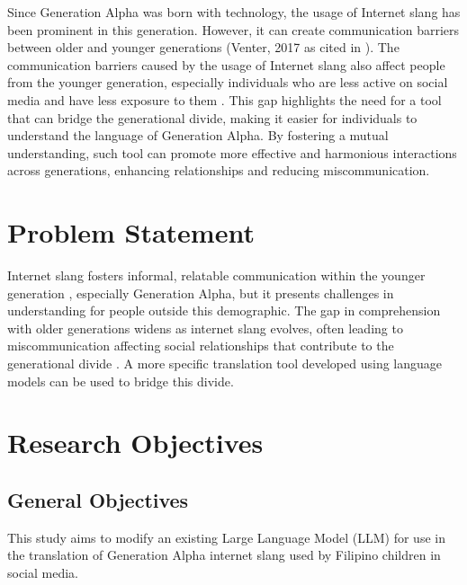 Since Generation Alpha was born with technology, the usage of Internet slang has been prominent in this generation.
However, it can create communication barriers between older and younger generations (Venter, 2017 as cited in \cite{Ghazali_Abdullah_2021}).
The communication barriers caused by the usage of Internet slang also affect people from the younger generation, especially individuals who are less active on social media and have less exposure to them \cite{Vacalares_Salas_Babac_Cagalawan_Calimpong_2023}.
This gap highlights the need for a tool that can bridge the generational divide, making it easier for individuals to understand the language of Generation Alpha.
By fostering a mutual understanding, such tool can promote more effective and harmonious interactions across generations, enhancing relationships and reducing miscommunication.

\section{Problem Statement}
\label{sec:problem_statement}

Internet slang fosters informal, relatable communication within the younger generation \cite{Ghazali_Abdullah_2021}, especially Generation Alpha, but it presents challenges in understanding for people outside this demographic. 
The gap in comprehension with older generations widens as internet slang evolves, often leading to miscommunication affecting social relationships that contribute to the generational divide \cite{Vacalares_Salas_Babac_Cagalawan_Calimpong_2023}. 
A more specific translation tool developed using language models can be used to bridge this divide.

\section{Research Objectives}
\label{sec:research_objectives}

\subsection{General Objectives}
\label{sec:general_objectives}
This study aims to modify an existing Large Language Model (LLM) for use in the translation of Generation Alpha internet slang used by Filipino children in social media.

